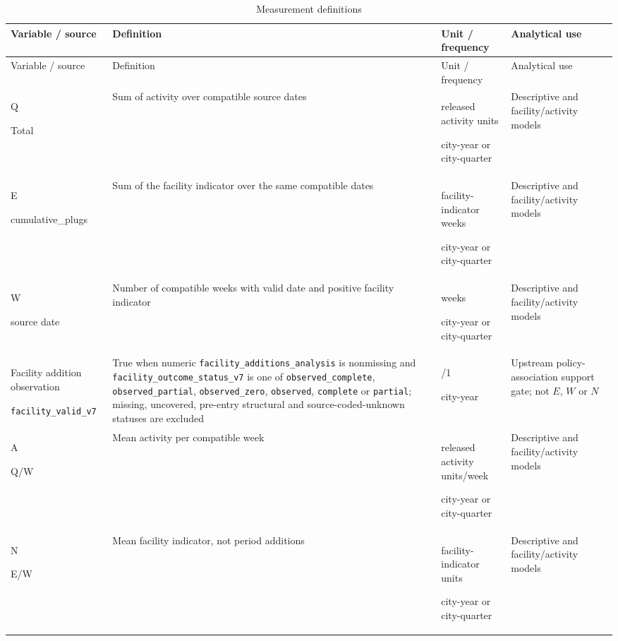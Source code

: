 \begingroup\footnotesize\setlength{\tabcolsep}{3pt}\begin{longtable}{@{}>{\raggedright\arraybackslash}p{30mm}>{\raggedright\arraybackslash}p{48mm}>{\raggedright\arraybackslash}p{30mm}>{\raggedright\arraybackslash}p{44mm}@{}}
\caption{Measurement definitions}\label{tab:data-dictionary}\\\toprule
Variable / source & Definition & Unit / frequency & Analytical use\\\midrule
\endfirsthead\toprule
Variable / source & Definition & Unit / frequency & Analytical use\\\midrule
\endhead\bottomrule\endfoot
Q\par Total & Sum of activity over compatible source dates & released activity units\par city-year or city-quarter & Descriptive and facility/\allowbreak{}activity models\\[3pt]
E\par cumulative\_\allowbreak{}plugs & Sum of the facility indicator over the same compatible dates & facility-indicator weeks\par city-year or city-quarter & Descriptive and facility/\allowbreak{}activity models\\[3pt]
W\par source date & Number of compatible weeks with valid date and positive facility indicator & weeks\par city-year or city-quarter & Descriptive and facility/\allowbreak{}activity models\\[3pt]
Facility addition observation\par \texttt{facility\_valid\_v7} & True when numeric \texttt{facility\_additions\_analysis} is nonmissing and \texttt{facility\_outcome\_status\_v7} is one of \texttt{observed\_complete}, \texttt{observed\_partial}, \texttt{observed\_zero}, \texttt{observed}, \texttt{complete} or \texttt{partial}; missing, uncovered, pre-entry structural and source-coded-unknown statuses are excluded & 0/1\par city-year & Upstream policy-association support gate; not $E$, $W$ or $N$\\[3pt]
A\par Q/\allowbreak{}W & Mean activity per compatible week & released activity units/\allowbreak{}week\par city-year or city-quarter & Descriptive and facility/\allowbreak{}activity models\\[3pt]
N\par E/\allowbreak{}W & Mean facility indicator, not period additions & facility-indicator units\par city-year or city-quarter & Descriptive and facility/\allowbreak{}activity models\\[3pt]

\end{longtable}

